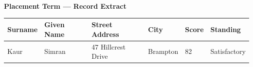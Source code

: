 \documentclass[11pt]{article}
\begin{document}
\begin{center}
{\large\bfseries Placement Term --- Record Extract}
\end{center}

\vspace{1.5em}

\begin{center}
\small
\begin{tabular}{@{}llllll@{}}
\toprule
\textbf{Surname} & \textbf{Given Name} & \textbf{Street Address} &
\textbf{City} & \textbf{Score} & \textbf{Standing} \\
\midrule
Kaur & Simran & 47 Hillcrest Drive & Brampton & 82 & Satisfactory \\
\bottomrule
\end{tabular}
\end{center}
\end{document}

